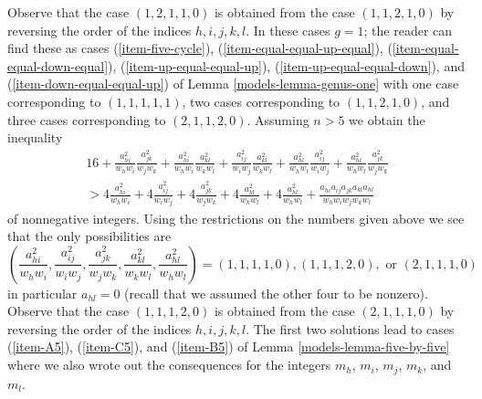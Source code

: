 Observe that the case $(1, 2, 1, 1, 0)$ is obtained from the case
$(1, 1, 2, 1, 0)$ by reversing the order of the indices $h, i, j, k, l$.
In these cases $g = 1$; the reader can find these as cases
(\ref{item-five-cycle}),
(\ref{item-equal-equal-up-equal}), (\ref{item-equal-equal-down-equal}),
(\ref{item-up-equal-equal-up}), (\ref{item-up-equal-equal-down}), and
(\ref{item-down-equal-equal-up}) of Lemma \ref{models-lemma-genus-one}
with one case corresponding to $(1, 1, 1, 1, 1)$,
two cases corresponding to $(1, 1, 2, 1, 0)$, and
three cases corresponding to $(2, 1, 1, 2, 0)$.
Assuming $n > 5$ we obtain the inequality
\begin{align*}
16 +
\frac{a_{hi}^2}{w_hw_i}\frac{a_{jk}^2}{w_jw_k} +
\frac{a_{hi}^2}{w_hw_i}\frac{a_{kl}^2}{w_kw_l} +
\frac{a_{ij}^2}{w_iw_j}\frac{a_{kl}^2}{w_kw_l} +
\frac{a_{hl}^2}{w_hw_l}\frac{a_{ij}^2}{w_iw_j} +
\frac{a_{hl}^2}{w_hw_l}\frac{a_{jk}^2}{w_jw_k} \\
> 4\frac{a_{hi}^2}{w_hw_i} +
4\frac{a_{ij}^2}{w_iw_j} +
4\frac{a_{jk}^2}{w_jw_k} +
4\frac{a_{kl}^2}{w_kw_l} +
4\frac{a_{hl}^2}{w_hw_l} +
\frac{a_{hi}a_{ij}a_{jk}a_{kl}a_{hl}}{w_hw_iw_jw_kw_l}
\end{align*}
of nonnegative integers.  Using the restrictions on the numbers given above
we see that the only possibilities are
$$
(\frac{a_{hi}^2}{w_hw_i}, \frac{a_{ij}^2}{w_iw_j},
\frac{a_{jk}^2}{w_jw_k}, \frac{a_{kl}^2}{w_kw_l}, \frac{a_{hl}^2}{w_hw_l}) =
(1, 1, 1, 1, 0), (1, 1, 1, 2, 0), \text{ or } (2, 1, 1, 1, 0)
$$
in particular $a_{hl} = 0$ (recall that we assumed the other four
to be nonzero). Observe that the case $(1, 1, 1, 2, 0)$
is obtained from the case $(2, 1, 1, 1, 0)$ by reversing the order
of the indices $h, i, j, k, l$. The first two solutions lead to
cases (\ref{item-A5}), (\ref{item-C5}), and (\ref{item-B5}) of
Lemma \ref{models-lemma-five-by-five} where we also wrote out the
consequences for the integers $m_h$, $m_i$, $m_j$, $m_k$, and $m_l$.

